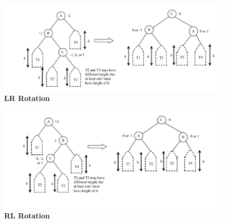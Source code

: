 \documentclass{memoir}%
\begin{document}
\begin{vplace}

\begin{figure}[h]
\begin{center}
 \includegraphics[width=\textwidth]{lr.png}
 \textbf{LR Rotation}
\end{center}
\end{figure}

\begin{figure}[h]
\begin{center}
 \includegraphics[width=\textwidth]{rl.png}
 \textbf{RL Rotation}
\end{center}
\end{figure}

\end{vplace}
\end{document}
